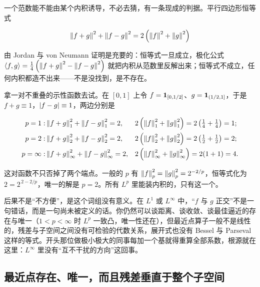 一个范数能不能由某个内积诱导，不必去猜，有一条现成的判据。平行四边形恒等式

\[
\left\lVert f+g\right\rVert^2+\left\lVert f-g\right\rVert^2=2\left(\left\lVert f\right\rVert^2+\left\lVert g\right\rVert^2\right)
\]

由 Jordan 与 von Neumann 证明是充要的：恒等式一旦成立，极化公式 \(\left\langle f,g\right\rangle=\tfrac14\left(\left\lVert f+g\right\rVert^2-\left\lVert f-g\right\rVert^2\right)\) 就把内积从范数里反解出来；恒等式不成立，任何内积都造不出来——不是没找到，是不存在。

拿一对不重叠的示性函数去试。在 \([0,1]\) 上令 \(f=\mathbf{1}_{[0,1/2]}\)、\(g=\mathbf{1}_{(1/2,1]}\)，于是 \(f+g\equiv1\)，\(\left|f-g\right|\equiv1\)，两边分别是

\[
\begin{aligned}
p=1:\space & \left\lVert f+g\right\rVert_1^2+\left\lVert f-g\right\rVert_1^2=2, & & 2\left(\left\lVert f\right\rVert_1^2+\left\lVert g\right\rVert_1^2\right)=2\left(\tfrac14+\tfrac14\right)=1;\\
p=2:\space & \left\lVert f+g\right\rVert_2^2+\left\lVert f-g\right\rVert_2^2=2, & & 2\left(\left\lVert f\right\rVert_2^2+\left\lVert g\right\rVert_2^2\right)=2\left(\tfrac12+\tfrac12\right)=2;\\
p=\infty:\space & \left\lVert f+g\right\rVert_\infty^2+\left\lVert f-g\right\rVert_\infty^2=2, & & 2\left(\left\lVert f\right\rVert_\infty^2+\left\lVert g\right\rVert_\infty^2\right)=2(1+1)=4 .
\end{aligned}
\]

这对函数不只否掉了两个端点。一般的 \(p\) 有 \(\left\lVert f\right\rVert_p^2=\left\lVert g\right\rVert_p^2=2^{-2/p}\)，恒等式化为 \(2=2^{\,2-2/p}\)，唯一的解是 \(p=2\)。所有 \(L^p\) 里能装内积的，只有这一个。

后果不是``不方便''，是这个词组没有意义。在 \(L^1\) 或 \(L^\infty\) 中，``\(f\) 与 \(g\) 正交''不是一句错话，而是一句尚未被定义的话。你仍然可以谈距离、谈收敛、谈最佳逼近的存在与唯一（\(1<p<\infty\) 时 \(L^p\) 一致凸，唯一性还在），但最近点算子一般不是线性的，残差与子空间之间没有可检验的代数关系，展开式也没有 Bessel 与 Parseval 这样的等式。开头那位做极小极大的同事每加一个基就得重算全部系数，根源就在这里：\(L^\infty\) 里没有``互不干扰的方向''这回事。

\subsection{最近点存在、唯一，而且残差垂直于整个子空间}

